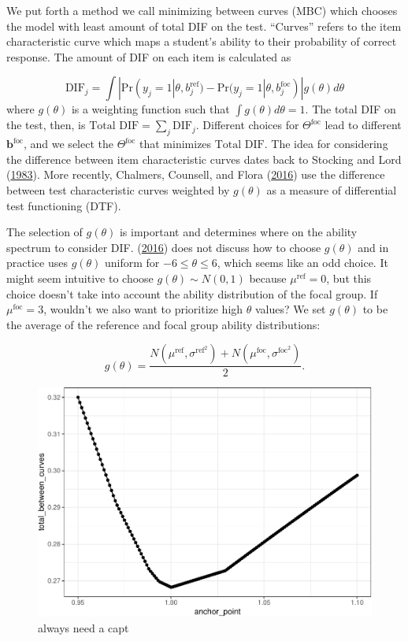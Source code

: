 \documentclass[
  11pt,
]{article}
\begin{document}
We put forth a method we call minimizing between curves (MBC) which chooses the model with least amount of total DIF on the test. \enquote{Curves} refers to the item characteristic curve which maps a student's ability to their probability of correct response. The amount of DIF on each item is calculated as

\[
\text{DIF}_j = \int |\text{Pr}(y_j = 1| \theta, b_j^{\text{ref}}) - \text{Pr}(y_j = 1| \theta, b_j^{\text{foc}})| g(\theta)d\theta
\]
where \(g(\theta)\) is a weighting function such that \(\int g(\theta)d\theta = 1\). The total DIF on the test, then, is \(\text{Total DIF} = \sum_{j} \text{DIF}_j\). Different choices for \(\Theta^{\text{foc}}\) lead to different \(\mathbf{b}^\text{foc}\), and we select the \(\Theta^{\text{foc}}\) that minimizes \(\text{Total DIF}\). The idea for considering the difference between item characteristic curves dates back to Stocking and Lord (\protect\hyperlink{ref-stocking1983developing}{1983}). More recently, Chalmers, Counsell, and Flora (\protect\hyperlink{ref-chalmers2016might}{2016}) use the difference between test characteristic curves weighted by \(g(\theta)\) as a measure of differential test functioning (DTF).

The selection of \(g(\theta)\) is important and determines where on the ability spectrum to consider DIF. (\protect\hyperlink{ref-chalmers2016might}{2016}) does not discuss how to choose \(g(\theta)\) and in practice uses \(g(\theta)\) uniform for \(-6 \le \theta \le 6\), which seems like an odd choice. It might seem intuitive to choose \(g(\theta) \sim N(0, 1)\) because \(\mu^\text{ref} = 0\), but this choice doesn't take into account the ability distribution of the focal group. If \(\mu^\text{foc} = 3\), wouldn't we also want to prioritize high \(\theta\) values? We set \(g(\theta)\) to be the average of the reference and focal group ability distributions:

\[
g(\theta) = \dfrac{N(\mu^{\text{ref}}, \sigma^{\text{ref}^2}) + N(\mu^{\text{foc}}, \sigma^{\text{foc}^2})}{2}.
\]

\begin{figure}[H]

{\centering \includegraphics[width=0.7\linewidth]{paper_files/figure-latex/workplease2-1} 

}

\caption{always need a capt}\label{fig:workplease2}
\end{figure}
\end{document}
